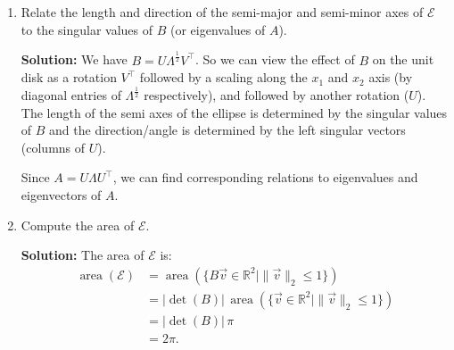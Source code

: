 \documentclass[10pt]{article}
\theoremstyle{definition}
\theoremstyle{plain}
\newcommand{\RR}{\mathbb{R}}
\DeclareMathOperator{\area}{area}
\begin{document}
\begin{enumerate}[label=(\alph*)]
We have,
\begin{align}
\mathcal{E} &= \{\vec{x} \in \RR,\; \vec{x}^\top A \vec{x} \leq 1\} \\
&= \{\vec{x} \in \RR^2,\; \vec{x}^\top C^\top C \vec{x} \leq 1\} \\
&= \{\vec{x} \in \RR^2,\; \|C\vec{x}\|_2^2 \leq 1\} \\
&= \{C^{-1}\vec{v},\; \|\vec{v}\|_2^2 \leq 1,\; \vec{v} \in \RR^2\} \\
&= \{B\vec{v},\; \|\vec{v}\|_2 \leq 1,\; \vec{v} \in \RR^2\}.
\end{align}

Another possible way to find $B$ is to remark that $C$ acts as a change of variables such that $v = Cx$, where $x = \begin{bmatrix} x_1 \\ x_2 \end{bmatrix}$. Choosing $C = \frac{1}{\sqrt{46}} \begin{bmatrix} 5 & -3 \\ 0 & 4 \end{bmatrix}$ gives the result that $\left(\left(\sqrt{5}\,x_1 - \frac{3\sqrt{5}}{5}x_2\right)^2 + \left(\frac{4\sqrt{5}}{5}x_2\right)^2\right) = 8\|v\|_2^2$. Then, defining $B = C^{-1}$ lets us write that $x = Bv$. These two equalities relating $x$ and $v$ let us rewrite the matching parts of the original definition of $\mathcal{E}$ into an expression in the form that we wanted.

\item Relate the length and direction of the semi-major and semi-minor axes of $\mathcal{E}$ to the singular values of $B$ (or eigenvalues of $A$).

\textbf{Solution:} We have $B = U\Lambda^{\frac{1}{2}}V^\top$. So we can view the effect of $B$ on the unit disk as a rotation $V^\top$ followed by a scaling along the $x_1$ and $x_2$ axis (by diagonal entries of $\Lambda^{\frac{1}{2}}$ respectively), and followed by another rotation ($U$). The length of the semi axes of the ellipse is determined by the singular values of $B$ and the direction/angle is determined by the left singular vectors (columns of $U$).

Since $A = U\Lambda U^\top$, we can find corresponding relations to eigenvalues and eigenvectors of $A$.

\item Compute the area of $\mathcal{E}$.

\textbf{Solution:} The area of $\mathcal{E}$ is:
\begin{align}
\area(\mathcal{E}) &= \area(\{B\vec{v} \in \RR^2 \mid \|\vec{v}\|_2 \leq 1\}) \\
&= |\det(B)|\, \area(\{\vec{v} \in \RR^2 \mid \|\vec{v}\|_2 \leq 1\}) \\
&= |\det(B)|\, \pi \\
&= 2\pi.
\end{align}
\end{enumerate}
\end{document}
